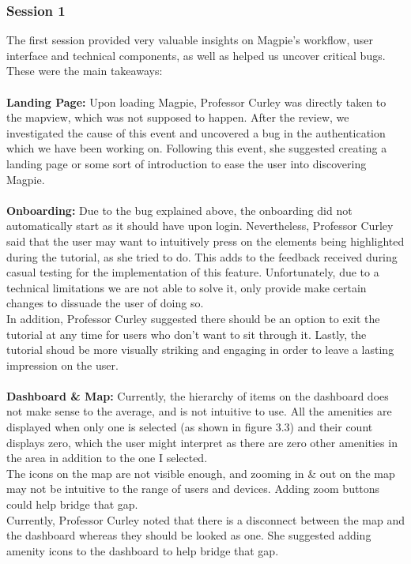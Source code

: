 \subsubsection{Session 1}
The first session provided very valuable insights on Magpie's workflow, user interface and technical components, as well as helped us uncover critical bugs. These were the main takeaways:\\ \\
\textbf{Landing Page: }
Upon loading Magpie, Professor Curley was directly taken to the mapview, which was not supposed to happen. After the review, we investigated the cause of this event and uncovered a bug in the authentication which we have been working on. Following this event, she suggested creating a landing page or some sort of introduction to ease the user into discovering Magpie.\\ \\
\textbf{Onboarding: }
Due to the bug explained above, the onboarding did not automatically start as it should have upon login. Nevertheless, Professor Curley said that the user may want to intuitively press on the elements being highlighted during the tutorial, as she tried to do. This adds to the feedback received during casual testing for the implementation of this feature. Unfortunately, due to a technical limitations we are not able to solve it, only provide make certain changes to dissuade the user of doing so.\\
In addition, Professor Curley suggested there should be an option to exit the tutorial at any time for users who don't want to sit through it. Lastly, the tutorial shoud be more visually striking and engaging in order to leave a lasting impression on the user.\\ \\
\textbf{Dashboard \& Map: }
Currently, the hierarchy of items on the dashboard does not make sense to the average, and is not intuitive to use. All the amenities are displayed when only one is selected (as shown in figure 3.3) and their count displays zero, which the user might interpret as there are zero other amenities in the area in addition to the one I selected.\\
The icons on the map are not visible enough, and zooming in \& out on the map may not be intuitive to the range of users and devices. Adding zoom buttons could help bridge that gap. \\
Currently, Professor Curley noted that there is a disconnect between the map and the dashboard whereas they should be looked as one. She suggested adding amenity icons to the dashboard to help bridge that gap.
